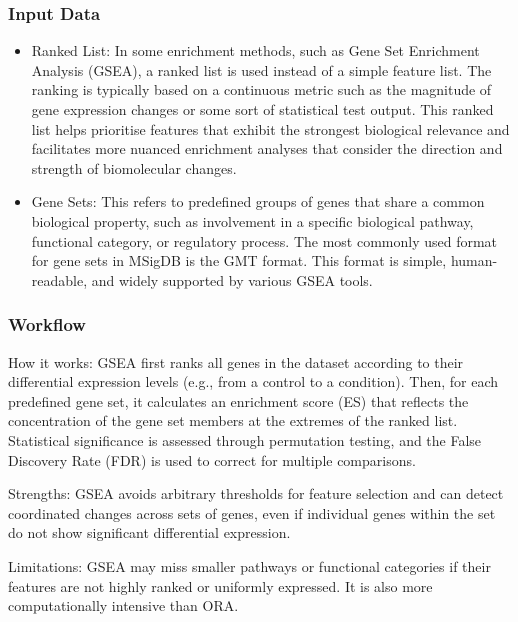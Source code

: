 \documentclass[
]{book}
\begin{document}
\hypertarget{input-data-1}{%
\subsubsection{Input Data}\label{input-data-1}}

\begin{itemize}
\item
  {Ranked List:} In some enrichment methods, such as Gene Set Enrichment Analysis (GSEA), a ranked list is used instead of a simple feature list. The ranking is typically based on a continuous metric such as the magnitude of gene expression changes or some sort of statistical test output. This ranked list helps prioritise features that exhibit the strongest biological relevance and facilitates more nuanced enrichment analyses that consider the direction and strength of biomolecular changes.
\item
  {Gene Sets:} This refers to predefined groups of genes that share a common biological property, such as involvement in a specific biological pathway, functional category, or regulatory process. The most commonly used format for gene sets in MSigDB is the GMT format. This format is simple, human-readable, and widely supported by various GSEA tools.
\end{itemize}

\hypertarget{workflow-1}{%
\subsubsection{Workflow}\label{workflow-1}}

{How it works}: GSEA first ranks all genes in the dataset according to their differential expression levels (e.g., from a control to a condition). Then, for each predefined gene set, it calculates an enrichment score (ES) that reflects the concentration of the gene set members at the extremes of the ranked list. Statistical significance is assessed through permutation testing, and the False Discovery Rate (FDR) is used to correct for multiple comparisons.

{Strengths}: GSEA avoids arbitrary thresholds for feature selection and can detect coordinated changes across sets of genes, even if individual genes within the set do not show significant differential expression.

{Limitations}: GSEA may miss smaller pathways or functional categories if their features are not highly ranked or uniformly expressed. It is also more computationally intensive than ORA.
\end{document}
